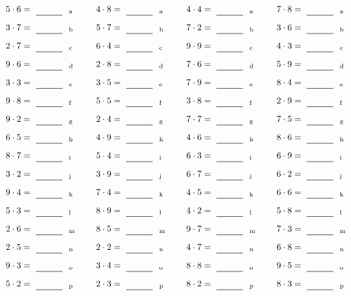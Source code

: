 \documentclass
[
  draft    = true,
  fontsize = 11pt,
  parskip  = half-
]
{scrartcl}
\begin{document}
\par\vfill\par
\begin{align*}
    \pline{5\cdot6}&=\rline{a}
  & \pline{4\cdot8}&=\rline{a}
  & \pline{4\cdot4}&=\rline{a}
  & \pline{7\cdot8}&=\rline{a} \\[1ex]
    \pline{3\cdot7}&=\rline{b}
  & \pline{5\cdot7}&=\rline{b}
  & \pline{7\cdot2}&=\rline{b}
  & \pline{3\cdot6}&=\rline{b} \\[1ex]
    \pline{2\cdot7}&=\rline{c}
  & \pline{6\cdot4}&=\rline{c}
  & \pline{9\cdot9}&=\rline{c}
  & \pline{4\cdot3}&=\rline{c} \\[1ex]
    \pline{9\cdot6}&=\rline{d}
  & \pline{2\cdot8}&=\rline{d}
  & \pline{7\cdot6}&=\rline{d}
  & \pline{5\cdot9}&=\rline{d} \\[1ex]
    \pline{3\cdot3}&=\rline{e}
  & \pline{3\cdot5}&=\rline{e}
  & \pline{7\cdot9}&=\rline{e}
  & \pline{8\cdot4}&=\rline{e} \\[1ex]
    \pline{9\cdot8}&=\rline{f}
  & \pline{5\cdot5}&=\rline{f}
  & \pline{3\cdot8}&=\rline{f}
  & \pline{2\cdot9}&=\rline{f} \\[1ex]
    \pline{9\cdot2}&=\rline{g}
  & \pline{2\cdot4}&=\rline{g}
  & \pline{7\cdot7}&=\rline{g}
  & \pline{7\cdot5}&=\rline{g} \\[1ex]
    \pline{6\cdot5}&=\rline{h}
  & \pline{4\cdot9}&=\rline{h}
  & \pline{4\cdot6}&=\rline{h}
  & \pline{8\cdot6}&=\rline{h} \\[1ex]
    \pline{8\cdot7}&=\rline{i}
  & \pline{5\cdot4}&=\rline{i}
  & \pline{6\cdot3}&=\rline{i}
  & \pline{6\cdot9}&=\rline{i} \\[1ex]
    \pline{3\cdot2}&=\rline{j}
  & \pline{3\cdot9}&=\rline{j}
  & \pline{6\cdot7}&=\rline{j}
  & \pline{6\cdot2}&=\rline{j} \\[1ex]
    \pline{9\cdot4}&=\rline{k}
  & \pline{7\cdot4}&=\rline{k}
  & \pline{4\cdot5}&=\rline{k}
  & \pline{6\cdot6}&=\rline{k} \\[1ex]
    \pline{5\cdot3}&=\rline{l}
  & \pline{8\cdot9}&=\rline{l}
  & \pline{4\cdot2}&=\rline{l}
  & \pline{5\cdot8}&=\rline{l} \\[1ex]
    \pline{2\cdot6}&=\rline{m}
  & \pline{8\cdot5}&=\rline{m}
  & \pline{9\cdot7}&=\rline{m}
  & \pline{7\cdot3}&=\rline{m} \\[1ex]
    \pline{2\cdot5}&=\rline{n}
  & \pline{2\cdot2}&=\rline{n}
  & \pline{4\cdot7}&=\rline{n}
  & \pline{6\cdot8}&=\rline{n} \\[1ex]
    \pline{9\cdot3}&=\rline{o}
  & \pline{3\cdot4}&=\rline{o}
  & \pline{8\cdot8}&=\rline{o}
  & \pline{9\cdot5}&=\rline{o} \\[1ex]
    \pline{5\cdot2}&=\rline{p}
  & \pline{2\cdot3}&=\rline{p}
  & \pline{8\cdot2}&=\rline{p}
  & \pline{8\cdot3}&=\rline{p}
\end{align*}
\end{document}
